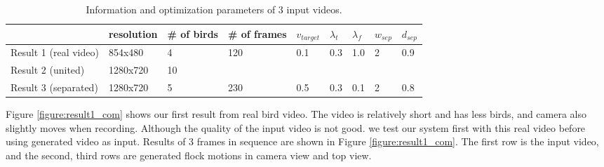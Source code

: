 \begin{table}[h]
\begin{tabular}{|l|l|l|l|l|l|l|l|l|}
\hline
  & resolution & \# of birds & \# of frames & $v_{target}$ & $\lambda_{t}$ & $\lambda_{f}$ & $w_{sep}$ & $d_{sep}$ \\ \hline
Result 1 (real video) & 854x480    & 4           & 120          & 0.1          & 0.3           & 1.0           & 2         & 0.9       \\ \hline
Result 2 (united)     & 1280x720   & 10          &              &              &               &               &           &           \\ \hline
Result 3 (separated)  & 1280x720   & 5           & 230          & 0.5          & 0.3           & 0.1           & 2         & 0.8       \\ \hline
\end{tabular}
\caption{Information and optimization parameters of 3 input videos.}
\label{table:result}
\end{table}




Figure \ref{figure:result1_com} shows our first result from real bird video. The video is relatively short and has less birds, and camera also  slightly moves when recording. Although the quality of the input video is not good. we test our system first with this real video before using generated video as input. Results of 3 frames in sequence are shown in Figure \ref{figure:result1_com}. The first row is the input video, and the second, third rows are generated flock motions in camera view and top view.



